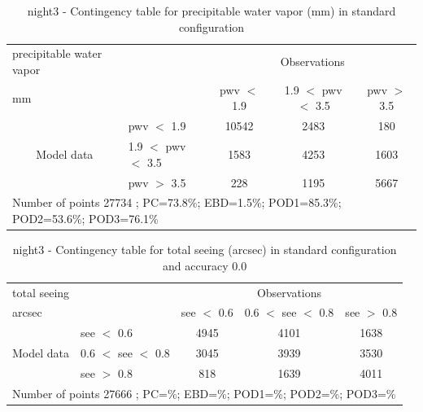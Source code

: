 \begin{table}[p!]
\begin{center}
\begin{tabular}{llccc}
\hline
{precipitable water vapor}                                       &                                                    & \multicolumn{3}{c}{Observations}                 \\
{mm}                                       &                             & pwv $<$ 1.9   & 1.9 $<$ pwv $<$ 3.5 & pwv $>$ 3.5 \\
\hline
\multicolumn{1}{c}{\multirow{3}{*}{Model data}}  & pwv $<$ 1.9             & 10542                & 2483                       & 180              \\
                                                 & 1.9  $<$ pwv $<$ 3.5 & 1583                & 4253                       & 1603              \\
                                                 & pwv $>$ 3.5             & 228                & 1195                       & 5667              \\
\hline
\multicolumn{5}{l}{ Number of points        27734 ; PC=73.8\%; EBD=1.5\%; POD1=85.3\%; POD2=53.6\%; POD3=76.1\%}                 \\
\end{tabular}
\end{center}
\caption{night3 - Contingency table for  precipitable water vapor (mm) in standard configuration  }
\label{tab:contingencypwvBEF:night3}
\end{table}
\clearpage
\begin{table}[p!]
\begin{center}
\begin{tabular}{llccc}
\hline
{total seeing}                                       &                                                    & \multicolumn{3}{c}{Observations}                 \\
{arcsec}                                       &                             & see $<$ 0.6   & 0.6 $<$ see $<$ 0.8 & see $>$ 0.8 \\
\hline
\multicolumn{1}{c}{\multirow{3}{*}{Model data}}  & see $<$ 0.6             & 4945                & 4101                       & 1638              \\
                                                 & 0.6  $<$ see $<$ 0.8 & 3045                & 3939                       & 3530              \\
                                                 & see $>$ 0.8             & 818                & 1639                       & 4011              \\
\hline
\multicolumn{5}{l}{ Number of points        27666 ; PC=\%; EBD=\%; POD1=\%; POD2=\%; POD3=\%}
\end{tabular}
\end{center}
\caption{night3 - Contingency table for  total seeing (arcsec) in standard configuration and accuracy 0.0}
\label{tab:contingencyseeBEF:night3}
\end{table}
